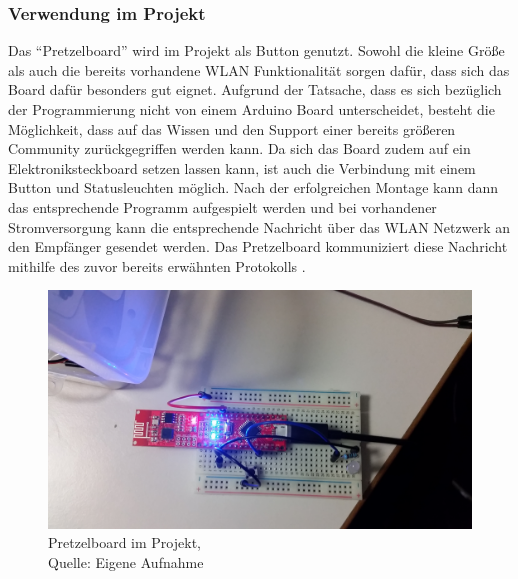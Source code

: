 \subsubsection{Verwendung im Projekt}        
\label{sec:Verwendung des ``Pretzelboard''} 
Das ``Pretzelboard'' wird im Projekt als Button genutzt. Sowohl die kleine Größe als auch die bereits vorhandene WLAN Funktionalität sorgen dafür, dass sich das Board dafür besonders gut eignet. Aufgrund der Tatsache, dass es sich bezüglich der Programmierung nicht von einem Arduino Board unterscheidet, besteht die Möglichkeit, dass auf das Wissen und den Support einer bereits größeren Community zurückgegriffen werden kann. 
Da sich das Board zudem auf ein Elektroniksteckboard setzen lassen kann, ist auch die Verbindung mit einem Button und Statusleuchten möglich. Nach der erfolgreichen Montage kann dann das entsprechende Programm aufgespielt werden und bei vorhandener Stromversorgung kann die entsprechende Nachricht über das WLAN Netzwerk an den Empfänger gesendet werden. Das Pretzelboard kommuniziert diese Nachricht mithilfe des zuvor bereits erwähnten Protokolls .

\begin{figure}[!htb]
	\centering
	\includegraphics[scale=0.1]{Pretzel_Projekt.jpg}
	\caption[Pretzelboard im Projekt]{Pretzelboard im Projekt,\\ Quelle: Eigene Aufnahme}
\end{figure}

\newpage